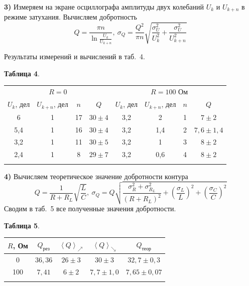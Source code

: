 \documentclass[11pt,a4paper]{article}
\begin{document}
\textbf{3)} Измеряем на экране осциллографа амплитуды двух колебаний $U_k$ и $U_{k+n}$ в режиме затухания. Вычисляем добротность
$$
Q=\frac{\pi n}{\ln\frac{U_k}{U_{k+n}}},\ 
\sigma_Q=\frac{Q^2}{\pi n}\sqrt{\frac{\sigma_U^2}{U_k^2}+\frac{\sigma_U^2}{U_{k+n}^2}}
$$

Результаты измерений и вычислений в таб.~4.

\begin{table}[h!]
	\begin{center}
			\textbf{Таблица 4}.\\
		\begin{tabular}{|c|c|c|c||c|c|c|c|}
			\hline\multicolumn{4}{|c||}{$R=0$}&\multicolumn{4}{c|}{$R=100$ Ом}\\
			\hhline{|-|-|-|-||-|-|-|-|}
			$U_k$, дел&$U_{k+n}$, дел&$n$&$Q$&
			$U_k$, дел&$U_{k+n}$, дел&$n$&$Q$\\
			\hhline{|-|-|-|-||-|-|-|-|}	6	&	1	&	17	& $30\pm4$	&	3,2	&	2	&	1	&$7\pm2$\\
			\hhline{|-|-|-|-||-|-|-|-|}	5,4	&	1	&	16	&$30\pm4$	&	3,2	&	1,4	&	2	&$7,6\pm1,4$\\
			\hhline{|-|-|-|-||-|-|-|-|}	3,2	&	1	&	11	&$30\pm5$	&	3,2	&	1	&	3	&$8\pm2$\\
			\hhline{|-|-|-|-||-|-|-|-|}	2,4	&	1	&	8	&$29\pm7$	&	3,2	&	0,6	&	4	&$8\pm2$\\
			\hline
			\multicolumn{8}{c}{\strut}\\
			
		\end{tabular}
	\end{center}
\end{table}
\textbf{4)} Вычисляем теоретическое значение добротности контура
	$$
	Q=\frac1{R+R_L}\sqrt{\frac LC},\ \sigma_Q=Q\sqrt{ \frac{\sigma_R^2+\sigma_{R_L}^2}{(R+R_L)^2}+\left( \frac{\sigma_L}L\right) ^2+\left( \frac{\sigma_C}C\right) ^2}
	$$
	Сводим в таб.~5 все полученные значения добротности.
	\begin{table}[h!]
		\begin{center}
						\textbf{Таблица 5}.\\
			\begin{tabular}{|c||c|c|c|c|}
				\hline
				$R$, Ом&$ Q_{\mbox{рез}} $&$\left\langle Q\right\rangle_{{\nearrow}} $&$\left\langle Q\right\rangle_{{\searrow}} $&$ Q_{\mbox{теор}}$\\
				\hline0&$36,36$&$26\pm3$&$30\pm3$&$32,7\pm0,3$\\
				\hline100&$7,41$&$6\pm2$&$7,7\pm1,0$&$7,65\pm0,07$\\
				\hline
				\multicolumn{5}{c}{\strut}\\

			\end{tabular}
		\end{center}
	\end{table}
\end{document}
